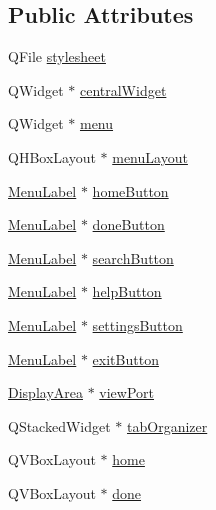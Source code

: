 \subsection*{Public Attributes}
\begin{DoxyCompactItemize}
\item 
Q\+File \hyperlink{class_do_lah_1_1_do_lah_u_i_a2a2ac44202eb31b09ad553bf02292e08}{stylesheet}
\item 
Q\+Widget $\ast$ \hyperlink{class_do_lah_1_1_do_lah_u_i_a2fa44a7efc6fb05e91c81cee35c875a8}{central\+Widget}
\item 
Q\+Widget $\ast$ \hyperlink{class_do_lah_1_1_do_lah_u_i_a71d63a85d5d5e7a246178f9489782eba}{menu}
\item 
Q\+H\+Box\+Layout $\ast$ \hyperlink{class_do_lah_1_1_do_lah_u_i_a46509e819fdf99522e8671525f634baf}{menu\+Layout}
\item 
\hyperlink{class_do_lah_1_1_menu_label}{Menu\+Label} $\ast$ \hyperlink{class_do_lah_1_1_do_lah_u_i_a10db92ff684ec50e9fa5ed47a8d50061}{home\+Button}
\item 
\hyperlink{class_do_lah_1_1_menu_label}{Menu\+Label} $\ast$ \hyperlink{class_do_lah_1_1_do_lah_u_i_a667668be28f14830fa6e53ea44324a16}{done\+Button}
\item 
\hyperlink{class_do_lah_1_1_menu_label}{Menu\+Label} $\ast$ \hyperlink{class_do_lah_1_1_do_lah_u_i_a87c5a907b22b61a08250d2121f2250c8}{search\+Button}
\item 
\hyperlink{class_do_lah_1_1_menu_label}{Menu\+Label} $\ast$ \hyperlink{class_do_lah_1_1_do_lah_u_i_a55a7b8556c0a1c314cc802878e988b54}{help\+Button}
\item 
\hyperlink{class_do_lah_1_1_menu_label}{Menu\+Label} $\ast$ \hyperlink{class_do_lah_1_1_do_lah_u_i_a04de929f73ffee4a744125185ead08da}{settings\+Button}
\item 
\hyperlink{class_do_lah_1_1_menu_label}{Menu\+Label} $\ast$ \hyperlink{class_do_lah_1_1_do_lah_u_i_a1a8e7f6fc6115438b29e0458530c0818}{exit\+Button}
\item 
\hyperlink{class_do_lah_1_1_display_area}{Display\+Area} $\ast$ \hyperlink{class_do_lah_1_1_do_lah_u_i_ad9a8bde1c82bdda188e9c545cfe42bd3}{view\+Port}
\item 
Q\+Stacked\+Widget $\ast$ \hyperlink{class_do_lah_1_1_do_lah_u_i_aa6dfb04e8eac6e74c41f97cf3e140484}{tab\+Organizer}
\item 
Q\+V\+Box\+Layout $\ast$ \hyperlink{class_do_lah_1_1_do_lah_u_i_aaaee95a773bb20bd6df8b7595561c32a}{home}
\item 
Q\+V\+Box\+Layout $\ast$ \hyperlink{class_do_lah_1_1_do_lah_u_i_a54adac752c5152aed15659a0d9879201}{done}

\end{DoxyCompactItemize}
